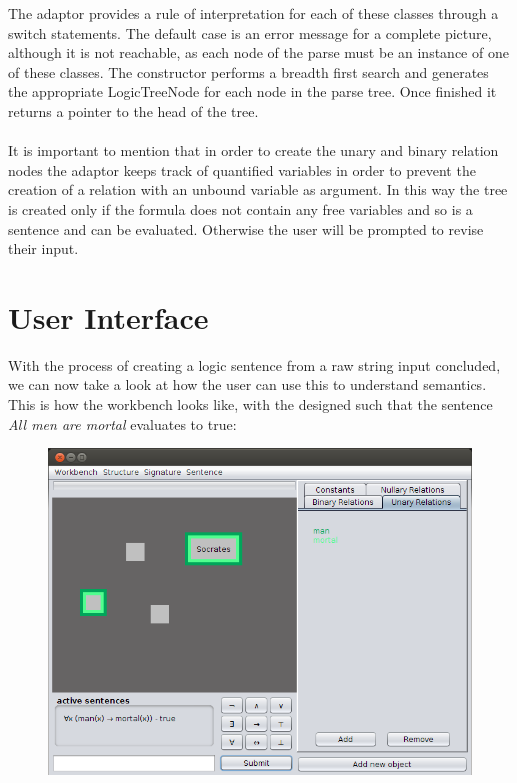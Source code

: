 \documentclass{report}
\begin{document}
The adaptor provides a rule of interpretation for each of these classes through 
a switch statements. The default case is an error message for a complete 
picture, although it is not reachable, as each node of the parse must be an 
instance of one of these classes. The constructor performs a breadth first 
search and generates the appropriate LogicTreeNode for each node in the parse 
tree. Once finished it returns a pointer to the head of the tree. 
\\ \\
It is important to mention that in order to create the unary and binary relation 
nodes the adaptor keeps track of quantified variables in order to prevent the 
creation of a relation with an unbound variable as argument. In this way the 
tree is created only if the formula does not contain any free variables and so 
is a sentence and can be evaluated. Otherwise the user will be prompted to 
revise their input.

\section{User Interface}
With the process of creating a logic sentence from a raw string input concluded, 
we can now take a look at how the user can use this to understand semantics. 
This is how the workbench looks like, with the designed such that the sentence 
\emph{All men are mortal} evaluates to true:
\begin{figure}[h!]
\centering \includegraphics[width=\textwidth]{workbench.png}
\end{figure}
\end{document}
